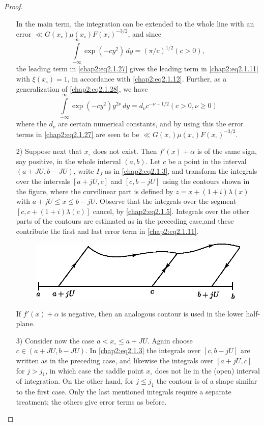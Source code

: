 \begin{proof}
\begin{enumerate}
In the main term, the integration can be extended to the whole line
with an error $\ll G(x_\circ)\mu(x_\circ)F(x_\circ)^{-3/2}$, and since 
\begin{equation}\label{chap2:eq2.1.28}
\int\limits_{-\infty}^\infty\exp\left(-cy^2\right)\,dy=(\pi/c)^{1/2}
(c>0), 
\end{equation}
the leading term in \eqref{chap2:eq2.1.27} gives the leading term in
\eqref{chap2:eq2.1.11} with $\xi(x_\circ)=1$, in accordance with
\eqref{chap2:eq2.1.12}. Further, as a generalization of
\eqref{chap2:eq2.1.28}, we have 
\begin{equation}\label{chap2:eq2.1.29}
\int\limits_{-\infty}^\infty\exp\left(-cy^2\right)y^{2\nu}\,dy= d_\nu
c^{-\nu-1/2}(c>0,\nu\geq 0)
\end{equation}
where the $d_\nu$ are certain numerical constants, and by using this
the error terms in \eqref{chap2:eq2.1.27} are seen to be $\ll
G(x_\circ)\mu(x_\circ)F(x_\circ)^{-3/2}$. 
\item [2)] Suppose next that $x_\circ$ does not exist. Then
  $f'(x)+\alpha$ is of the same sign, say positive, in the whole
  interval $(a,b)$. Let $c$ be a point in the interval $(a+JU,b-JU)$,
  write $I_J$ as in \eqref{chap2:eq2.1.3}, and transform the integrals
  over the intervals $[a+jU,c]$ and $[c,b-jU]$ using the contours
  shown in the figure, where the curvilinear part is defined by
  $z=x+(1+i)\lambda(x)$ with $a+jU\leq x\leq b-jU$. Observe that the
  integrals over the segment $[c,c+(1+i)\lambda(c)]$ cancel, by
  \eqref{chap2:eq2.1.5}. Integrals over the other parts of the
  contours are estimated as in the preceding case,\pageoriginale and
  these contribute the first and last error term in
  \eqref{chap2:eq2.1.11}. 
\begin{figure}[H]
\centering
\includegraphics{fig2.eps}
\end{figure}

If $f'(x)+\alpha$ is negative, then an analogous contour is used in
the lower half-plane.
\item [3)] Consider now the case $a<x_\circ \leq a+ JU$. Again choose
$c\in (a+JU,b-JU)$. In \eqref{chap2:eq2.1.3} the integrals over
  $[c,b-jU]$ are written as in the preceding case, and likewise the
  integrals over $[a+jU,c]$ for $j>j_1$, in which case the saddle
  point $x_\circ$ does not lie in the (open) interval of
  integration. On the other hand, for $j\leq j_1$ the contour is of a
  shape similar to the first case. Only the last mentioned integrals
  require a separate treatment; the others give error terms as before.


\end{enumerate}
\end{proof}
